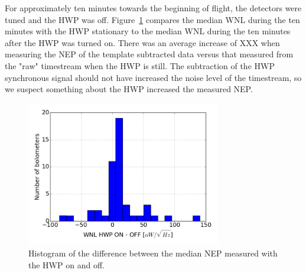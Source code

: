 For approximately ten minutes towards the beginning of flight, the detectors were tuned and the \ac{HWP} was off. 
Figure~\ref{fig:hwp_on_vs_off} compares the median \ac{WNL} during the ten minutes with the \ac{HWP} stationary to the median \ac{WNL} during the ten minutes after the \ac{HWP} was turned on. 
There was an average increase of XXX when measuring the \ac{NEP} of the template subtracted data versus that measured from the "raw" timestream when the \ac{HWP} is still. 
The subtraction of the \ac{HWP} synchronous signal should not have increased the noise level of the timestream, so we suspect something about the \ac{HWP} increased the measured \ac{NEP}. 

\begin{figure}[ht!]
\begin{center}
\includegraphics[height=2.5in]{figures/hwp_on_and_off_median_diff_histogram.png}
\caption[Histogram of difference between noise measured with the HWP on and off]{Histogram of the difference between the median \ac{NEP} measured with the \ac{HWP} on and off. 
\label{fig:hwp_on_vs_off} }
\end{center}
\end{figure}



